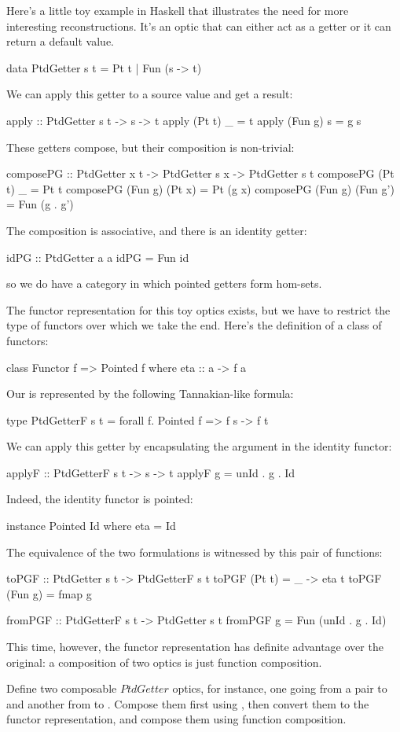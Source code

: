 \documentclass[DaoFP]{subfiles}
\begin{document}
Here's a little toy example in Haskell that illustrates the need for more interesting reconstructions. It's an optic that can either act as a getter or it can return a default value.
\begin{haskell}
data PtdGetter s t = Pt t | Fun (s -> t)
\end{haskell}
We can apply this getter to a source value and get a result:
\begin{haskell}
apply :: PtdGetter s t -> s -> t
apply (Pt t) _ = t
apply (Fun g) s = g s
\end{haskell}

These getters compose, but their composition is non-trivial:
\begin{haskell}
composePG :: PtdGetter x t -> PtdGetter s x -> PtdGetter s t
composePG (Pt t) _ = Pt t
composePG (Fun g) (Pt x) = Pt (g x)
composePG (Fun g) (Fun g') = Fun (g . g')
\end{haskell}
The composition is associative, and there is an identity getter:
\begin{haskell}
idPG :: PtdGetter a a
idPG = Fun id
\end{haskell}
so we do have a category in which pointed getters form hom-sets. 

The functor representation for this toy optics exists, but we have to restrict the type of functors over which we take the end. Here's the definition of a class of  functors:
\begin{haskell}
class Functor f => Pointed f where
  eta :: a -> f a
\end{haskell}
Our  is represented by the following Tannakian-like formula:
\begin{haskell}
type PtdGetterF s t = forall f. Pointed f => f s -> f t
\end{haskell}
We can apply this getter by encapsulating the argument in the identity functor:
\begin{haskell}
applyF :: PtdGetterF s t -> s -> t
applyF g = unId . g . Id
\end{haskell}
Indeed, the identity functor is pointed:
\begin{haskell}
instance Pointed Id where
  eta = Id
\end{haskell}
The equivalence of the two formulations is witnessed by this pair of functions:
\begin{haskell}
toPGF :: PtdGetter s t -> PtdGetterF s t
toPGF (Pt t) = \_ -> eta t
toPGF (Fun g) = fmap g

fromPGF :: PtdGetterF s t -> PtdGetter s t
fromPGF g = Fun (unId . g . Id)
\end{haskell}
This time, however, the functor representation has definite advantage over the original: a composition of two  optics is just function composition.
\begin{exercise}
Define two composable $PtdGetter$ optics, for instance, one going from a pair  to  and another from  to . Compose them first using , then convert them to the functor representation, and compose them using function composition.
\end{exercise}
\end{document}
